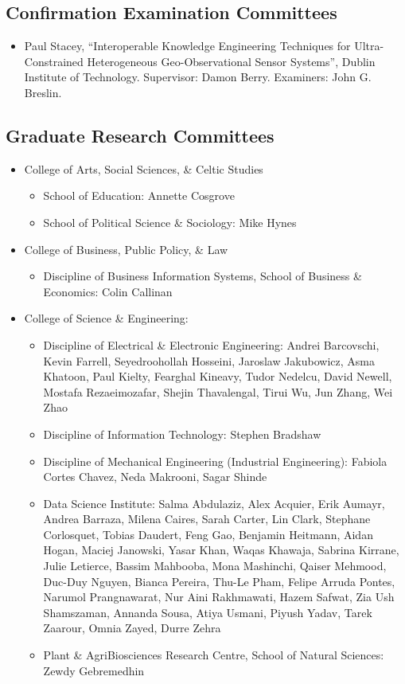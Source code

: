 \documentclass[10pt,a4paper]{res} %
\begin{document}
\begin{resume}
\subsection*{Confirmation Examination Committees}

\begin{itemize} \itemsep -2pt
\item Paul Stacey, ``Interoperable Knowledge Engineering Techniques for Ultra-Constrained Heterogeneous Geo-Observational Sensor Systems'', Dublin Institute of Technology. Supervisor: Damon Berry. Examiners: John G. Breslin.
\end{itemize}

\subsection*{Graduate Research Committees}

\begin{itemize} \itemsep -2pt
\item College of Arts, Social Sciences, \& Celtic Studies
\begin{itemize}
\item School of Education: Annette Cosgrove
\item School of Political Science \& Sociology: Mike Hynes
\end{itemize}
\item College of Business, Public Policy, \& Law
\begin{itemize}
\item Discipline of Business Information Systems, School of Business \& Economics: Colin Callinan
\end{itemize}
\item College of Science \& Engineering:
\begin{itemize}
\item Discipline of Electrical \& Electronic Engineering: Andrei Barcovschi, Kevin Farrell, Seyedroohollah Hosseini, Jaroslaw Jakubowicz, Asma Khatoon, Paul Kielty, Fearghal Kineavy, Tudor Nedelcu, David Newell, Mostafa Rezaeimozafar, Shejin Thavalengal, Tirui Wu, Jun Zhang, Wei Zhao
\item Discipline of Information Technology: Stephen Bradshaw
\item Discipline of Mechanical Engineering (Industrial Engineering): Fabiola Cortes Chavez, Neda Makrooni, Sagar Shinde
\item Data Science Institute: Salma Abdulaziz, Alex Acquier, Erik Aumayr, Andrea Barraza, Milena Caires, Sarah Carter, Lin Clark, Stephane Corlosquet, Tobias Daudert, Feng Gao, Benjamin Heitmann, Aidan Hogan, Maciej Janowski, Yasar Khan, Waqas Khawaja, Sabrina Kirrane, Julie Letierce, Bassim Mahbooba, Mona Mashinchi, Qaiser Mehmood, Duc-Duy Nguyen, Bianca Pereira, Thu-Le Pham, Felipe Arruda Pontes, Narumol Prangnawarat, Nur Aini Rakhmawati, Hazem Safwat, Zia Ush Shamszaman, Annanda Sousa, Atiya Usmani, Piyush Yadav, Tarek Zaarour, Omnia Zayed, Durre Zehra
\item Plant \& AgriBiosciences Research Centre, School of Natural Sciences: Zewdy Gebremedhin
\end{itemize}
\end{itemize}


\end{resume}
\end{document}
